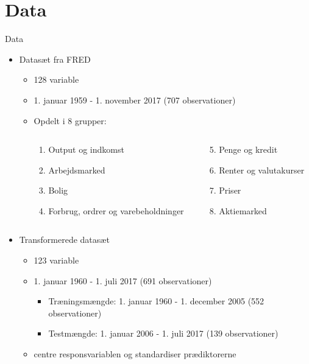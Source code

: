 \section{Data}
\begin{frame}{Data}
\begin{itemize}
\item Datasæt fra FRED
\begin{itemize}
\item 128 variable
\item 1. januar 1959 - 1. november 2017 (707 observationer)
\item Opdelt i 8 grupper:
\begin{columns}
\begin{column}{0.35\textwidth}
    \begin{enumerate}
	\item Output og indkomst 
	\item Arbejdsmarked  
	\item Bolig 
	\item Forbrug, ordrer og varebeholdninger 
\end{enumerate}
\end{column}
\begin{column}{0.35\textwidth} 
    \begin{enumerate}
    \setcounter{enumi}{4}
	\item Penge og kredit 
	\item Renter og valutakurser 
	\item Priser 
	\item Aktiemarked 
\end{enumerate}
\end{column}
\end{columns}
\end{itemize}

\item Transformerede datasæt
\begin{itemize}
\item 123 variable
\item 1. januar 1960 - 1. juli 2017 (691 observationer)
\begin{itemize}
\item Træningsmængde: 1. januar 1960 - 1. december 2005 (552 observationer)
\item Testmængde: 1. januar 2006 - 1. juli 2017 (139 observationer)
\end{itemize}
\item centre responsvariablen og standardiser prædiktorerne
\end{itemize}
\end{itemize}
\end{frame}

